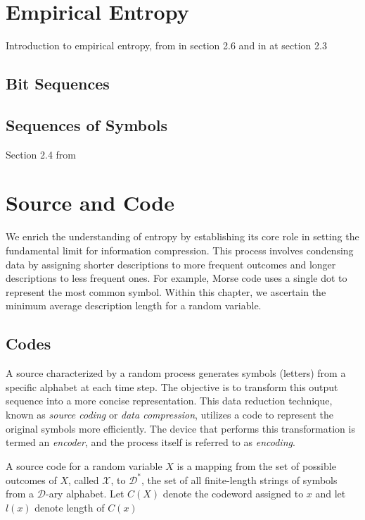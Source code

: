 \clearpage
\section{Empirical Entropy}
Introduction to empirical entropy, from \cite{han2002mathematics} in section 2.6 and in \cite{navarro2016compact} at section 2.3
\subsection{Bit Sequences}
\subsection{Sequences of Symbols}

Section 2.4 from \cite{navarro2016compact}

\clearpage
\section{Source and Code}

We enrich the understanding of entropy by establishing its core role in setting the fundamental limit for information compression. This process involves condensing data by assigning shorter descriptions to more frequent outcomes and longer descriptions to less frequent ones. For example, Morse code uses a single dot to represent the most common symbol. Within this chapter, we ascertain the minimum average description length for a random variable. \cite{ElementsofInformationTheory}

\subsection{Codes}

A source characterized by a random process generates symbols (letters) from a specific alphabet at each time step. The objective is to transform this output sequence into a more concise representation. This data reduction technique, known as \emph{source coding} or \emph{data compression}, utilizes a code to represent the original symbols more efficiently. The device that performs this transformation is termed an \emph{encoder}, and the process itself is referred to as \emph{encoding}. \cite{han2002mathematics}

\begin{definition}\label{def:code}
    A source code for a random variable $X$ is a mapping from the set of possible outcomes of $X$, called $\mathcal{X}$, to $\mathcal{D}^*$, the set of all finite-length strings of symbols from a $\mathcal{D}$-ary alphabet. Let $C(X)$ denote the codeword assigned to $x$ and let $l(x)$ denote length of $C(x)$
\end{definition}

